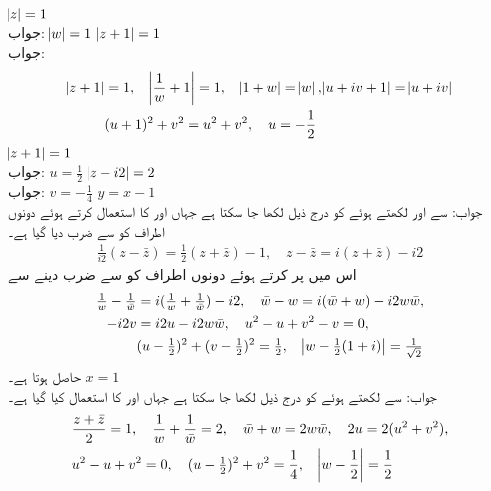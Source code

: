 \quad
$\abs{z}=1$\\
جواب:\quad
$\abs{w}=1$
\quad
$\abs{z+1}=1$\\
جواب:\quad
\begin{align*}
\abs{z+1}&=1,\quad \abs{\frac{1}{w}+1}=1,\quad \abs{1+w}=\abs{w}, \abs{u+iv+1}=\abs{u+iv}\\
&(u+1)^2+v^2=u^2+v^2, \quad u=-\frac{1}{2}
\end{align*}
\quad
$\abs{z+1}=1$\\
جواب:\quad
$u=\frac{1}{2}$
\quad
$\abs{z-i2}=2$\\
جواب:\quad
$v=-\tfrac{1}{4}$
\quad
$y=x-1$\\
جواب:\quad
{} سے  اور  لکھتے ہوئے  کو درج ذیل لکھا جا سکتا ہے جہاں  اور  کا استعمال کرتے ہوئے دونوں اطراف کو   سے ضرب دیا گیا ہے۔
\begin{align*}
\tfrac{1}{i2}(z-\bar{z})=\tfrac{1}{2}(z+\bar{z})-1, \quad z-\bar{z}=i(z+\bar{z})-i2
\end{align*}
اس میں  پر کرتے ہوئے دونوں اطراف کو  سے ضرب دینے سے
\begin{align*}
\tfrac{1}{w}-\tfrac{1}{\bar{w}}&=i(\tfrac{1}{w}+\tfrac{1}{\bar{w}})-i2,\quad \bar{w}-w=i(\bar{w}+w)-i2w\bar{w},\\
-i2v&=i2u-i2w\bar{w},\quad  u^2-u+v^2-v=0,\\
 &(u-\tfrac{1}{2})^2+(v-\tfrac{1}{2})^2=\tfrac{1}{2},\quad \abs{w-\tfrac{1}{2}(1+i)}=\tfrac{1}{\sqrt{2}}
\end{align*}
حاصل ہوتا ہے۔
\quad
$x=1$\\
جواب:\quad {} سے  لکھتے ہوئے  کو درج ذیل لکھا جا سکتا ہے جہاں  اور  کا استعمال کیا گیا ہے۔
\begin{align*}
&\frac{z+\bar{z}}{2}=1,\quad \frac{1}{w}+\frac{1}{\bar{w}}=2,\quad \bar{w}+w=2w\bar{w},\quad 2u=2(u^2+v^2),\\
& u^2-u+v^2=0,\quad (u-\tfrac{1}{2})^2+v^2=\frac{1}{4},\quad \abs{w-\frac{1}{2}}=\frac{1}{2}
\end{align*}
